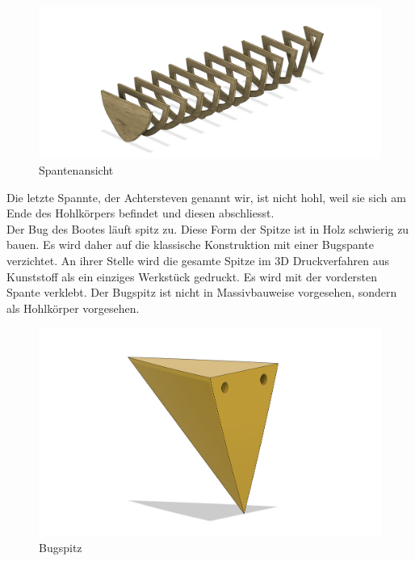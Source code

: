 {\begin{figure}[H]
    \centering
    \includegraphics[width=1\linewidth]{assets/rippen_cad.png}
    \caption{Spantenansicht}
    
\end{figure}
Die letzte Spannte, der Achtersteven genannt wir, ist nicht hohl, weil sie sich am Ende des Hohlkörpers befindet und diesen abschliesst.  \\
Der Bug des Bootes läuft spitz zu. Diese Form der Spitze ist in Holz schwierig zu bauen. Es wird daher auf die klassische Konstruktion mit einer Bugspante verzichtet. An ihrer Stelle wird die gesamte Spitze im 3D Druckverfahren aus Kunststoff als ein einziges Werkstück gedruckt. Es wird mit der vordersten Spante verklebt. Der Bugspitz ist nicht in Massivbauweise vorgesehen, sondern als Hohlkörper vorgesehen.
\begin{figure}[H]
    \centering
    \includegraphics[width=0.8\linewidth]{assets/bug_spitz.png}
 \caption{Bugspitz}
    

\end{figure}}
